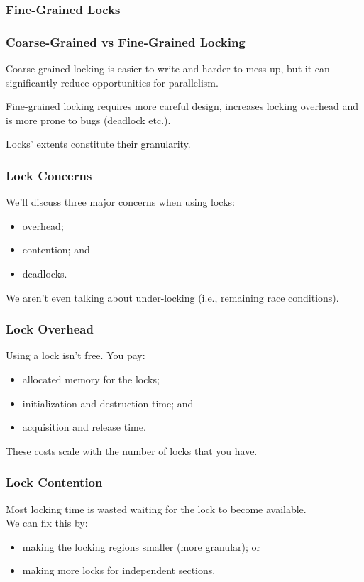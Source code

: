\begin{frame}
\frametitle{Fine-Grained Locks}

  \begin{center}
    
  \end{center}

\end{frame}

\begin{frame}
\frametitle{Coarse-Grained vs Fine-Grained Locking}

\alert{Coarse-grained} locking is easier to write and harder to mess up, but it can significantly reduce opportunities for parallelism. 

\alert{Fine-grained locking} requires more careful design,
increases locking overhead and is more prone to bugs (deadlock etc.).  


Locks' extents constitute their granularity. 

\end{frame}


\begin{frame}
\frametitle{Lock Concerns}

We'll discuss three major concerns when using locks:
  \begin{itemize}
    \item overhead;
    \item contention; and
    \item deadlocks.
  \end{itemize}
  
  
We aren't even talking about under-locking (i.e., remaining race conditions).

\end{frame}

\begin{frame}
\frametitle{Lock Overhead}

  Using a lock isn't free. You pay:
  \begin{itemize}
    \item allocated memory for the locks;
    \item initialization and destruction time; and
    \item acquisition and release time.
  \end{itemize}


  These costs scale with the number of locks that you have.
\end{frame}


\begin{frame}
\frametitle{Lock Contention}

\vspace*{-3em}
 Most locking time is wasted waiting for the lock to become available.\\[1em]
We can fix this by:
\vspace*{-3em}
      \begin{itemize}
        \item making the locking regions smaller (more granular); or
        \item making more locks for independent sections.
      \end{itemize}


\end{frame}

